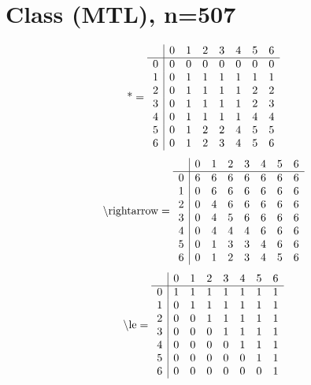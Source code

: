 \documentclass[11pt]{article}
\begin{document}
\section{Class (MTL), n=507}
\[\text{*} = 
\begin{array}{r | r r r r r r r}
 & 0 & 1 & 2 & 3 & 4 & 5 & 6 \\ \hline
0 & 0 & 0 & 0 & 0 & 0 & 0 & 0 \\
1 & 0 & 1 & 1 & 1 & 1 & 1 & 1 \\
2 & 0 & 1 & 1 & 1 & 1 & 2 & 2 \\
3 & 0 & 1 & 1 & 1 & 1 & 2 & 3 \\
4 & 0 & 1 & 1 & 1 & 1 & 4 & 4 \\
5 & 0 & 1 & 2 & 2 & 4 & 5 & 5 \\
6 & 0 & 1 & 2 & 3 & 4 & 5 & 6 \\
\end{array}
\]
\[\text{\textbackslash rightarrow} = 
\begin{array}{r | r r r r r r r}
 & 0 & 1 & 2 & 3 & 4 & 5 & 6 \\ \hline
0 & 6 & 6 & 6 & 6 & 6 & 6 & 6 \\
1 & 0 & 6 & 6 & 6 & 6 & 6 & 6 \\
2 & 0 & 4 & 6 & 6 & 6 & 6 & 6 \\
3 & 0 & 4 & 5 & 6 & 6 & 6 & 6 \\
4 & 0 & 4 & 4 & 4 & 6 & 6 & 6 \\
5 & 0 & 1 & 3 & 3 & 4 & 6 & 6 \\
6 & 0 & 1 & 2 & 3 & 4 & 5 & 6 \\
\end{array}
\]
\[\text{\textbackslash le} = 
\begin{array}{r | r r r r r r r}
 & 0 & 1 & 2 & 3 & 4 & 5 & 6 \\ \hline
0 & 1 & 1 & 1 & 1 & 1 & 1 & 1 \\
1 & 0 & 1 & 1 & 1 & 1 & 1 & 1 \\
2 & 0 & 0 & 1 & 1 & 1 & 1 & 1 \\
3 & 0 & 0 & 0 & 1 & 1 & 1 & 1 \\
4 & 0 & 0 & 0 & 0 & 1 & 1 & 1 \\
5 & 0 & 0 & 0 & 0 & 0 & 1 & 1 \\
6 & 0 & 0 & 0 & 0 & 0 & 0 & 1 \\
\end{array}
\]
\end{document}
